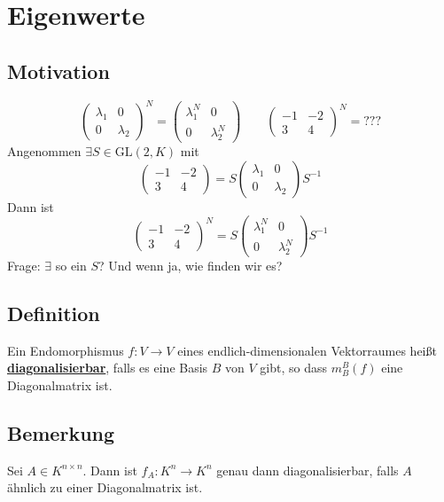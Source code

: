 \newpage
\section{Eigenwerte} %
\label{sec:eigenwerte}

\subsection{Motivation} %
\label{sub:motivation}
\[
	\begin{pmatrix}
		\lambda_1 & 0 \\
		0 & \lambda_2
	\end{pmatrix}^N = \begin{pmatrix}
		\lambda_1^N & 0 \\
		0 & \lambda_2^N
	\end{pmatrix}
	\qquad \begin{pmatrix}
		-1 & -2 \\
		3 & 4
	\end{pmatrix}^N = \text{???}
\]
Angenommen $\exists S \in \text{GL}(2,K)$ mit
\[
	\begin{pmatrix}
		-1 &-2 \\
		3 & 4
	\end{pmatrix} = S \begin{pmatrix}
		\lambda_1 & 0 \\
		0 & \lambda_2
	\end{pmatrix} S ^{-1}
\]
Dann ist
\[
	\begin{pmatrix}
		-1 &-2 \\
		3 & 4
	\end{pmatrix}^N = S \begin{pmatrix}
		\lambda_1^N & 0 \\
		0 & \lambda_2^N
	\end{pmatrix} S ^{-1}
\]
Frage: $\exists$ so ein $S$? Und wenn ja, wie finden wir es?

\subsection{Definition} %
\label{sub:definition}
Ein Endomorphismus $f : V \to V$ eines endlich-dimensionalen Vektorraumes heißt \textbf{\underline{diagonalisierbar}}, falls es eine Basis $B$ von $V$ gibt,
so dass $m_B^B (f)$ eine Diagonalmatrix ist.

\subsection{Bemerkung} %
\label{sub:bemerkung}
Sei $A \in K^{n \times n}$. Dann ist $f_A : K^n \to K^n$ genau dann diagonalisierbar, falls $A$ ähnlich zu einer Diagonalmatrix ist.

